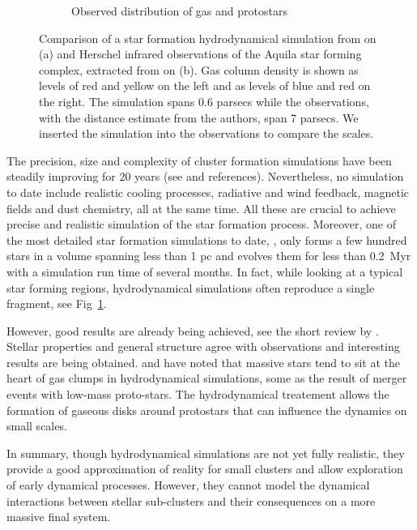 \begin{figure}
\begin{subfigure}[b]{0.48\textwidth}
        \caption{Observed distribution of gas and protostars}
        \label{Fig:0_aquila_bate2012}
    \end{subfigure}
\caption[Hydrodynamical simulation of a star forming clump scaled to infrared observations]{Comparison of a star formation hydrodynamical simulation from \cite{Bate2012}  on (a) and Herschel infrared observations of the Aquila star forming complex, extracted from \cite{Konyves2010} on (b). Gas column density is shown as levels of red and yellow on the left and as levels of blue and red on the right. The simulation spans 0.6 parsecs while the observations, with the distance estimate from the authors, span 7 parsecs. We inserted the simulation into the observations to compare the scales.}
\label{Fig:0_clumps}
\end{figure}



The precision, size and complexity of cluster formation simulations have been steadily improving for 20 years (see \citealt{Turner1995,Klessen2000,Bate2003,Offner2009,Myers2014} and references). Nevertheless, no simulation to date include realistic cooling processes, radiative and wind feedback, magnetic fields and dust chemistry, all at the same time. All these are crucial to achieve precise and realistic simulation of the star formation process. Moreover, one of the most detailed star formation simulations to date, \cite{Bate2012}, only forms a few hundred stars in a volume spanning less than 1 pc and evolves them for less than 0.2~Myr with a simulation run time of several months. In fact, while looking at a typical star forming regions, hydrodynamical simulations often reproduce a single fragment, see Fig~\ref{Fig:0_aquila_bate2012}.

However, good results are already being achieved, see the short review by \cite{Clarke2012}. Stellar properties and general structure agree with observations and interesting results are being obtained. \cite{Maschberger2011} and \cite{Moeckel2011} have noted that massive stars tend to sit at the heart of gas clumps in hydrodynamical simulations, some as the result of merger events with low-mass proto-stars. The hydrodynamical treatement allows the formation of gaseous disks around protostars that can influence the dynamics on small scales.

In summary, though hydrodynamical simulations are not yet fully realistic, they provide a good approximation of reality for small clusters and allow exploration of early dynamical processes. However, they cannot model the dynamical interactions between stellar sub-clusters and their consequences on a more massive final system.


